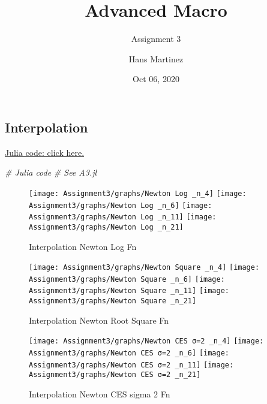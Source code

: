 \documentclass[]{article}
\title{Advanced Macro}
\subtitle{Assignment 3}
\author{Hans Martinez}
\date{Oct 06, 2020}
\newenvironment{Shaded}{\begin{snugshade}}{\end{snugshade}}
\newcommand{\CommentTok}[1]{\textcolor[rgb]{0.56,0.35,0.01}{\textit{#1}}}
\begin{document}
\maketitle

\hypertarget{interpolation}{%
\subsection{Interpolation}\label{interpolation}}

\href{https://github.com/hans-mtz/AdvMacro/blob/master/A3.jl}{Julia
code: click here.}

\begin{Shaded}
\begin{Highlighting}[]
\CommentTok{# Julia code}
\CommentTok{# See A3.jl}
\end{Highlighting}
\end{Shaded}

\begin{figure}

{\centering \texttt{[image: Assignment3/graphs/Newton Log \_n\_4]} \texttt{[image: Assignment3/graphs/Newton Log \_n\_6]} \texttt{[image: Assignment3/graphs/Newton Log \_n\_11]} \texttt{[image: Assignment3/graphs/Newton Log \_n\_21]} 

}

\caption{Interpolation Newton Log Fn}\label{fig:unnamed-chunk-2}
\end{figure}

\begin{figure}

{\centering \texttt{[image: Assignment3/graphs/Newton Square \_n\_4]} \texttt{[image: Assignment3/graphs/Newton Square \_n\_6]} \texttt{[image: Assignment3/graphs/Newton Square \_n\_11]} \texttt{[image: Assignment3/graphs/Newton Square \_n\_21]} 

}

\caption{Interpolation Newton Root Square Fn}\label{fig:unnamed-chunk-3}
\end{figure}

\begin{figure}

{\centering \texttt{[image: Assignment3/graphs/Newton CES σ=2 \_n\_4]} \texttt{[image: Assignment3/graphs/Newton CES σ=2 \_n\_6]} \texttt{[image: Assignment3/graphs/Newton CES σ=2 \_n\_11]} \texttt{[image: Assignment3/graphs/Newton CES σ=2 \_n\_21]} 

}

\caption{Interpolation Newton CES sigma 2 Fn}\label{fig:unnamed-chunk-4}
\end{figure}
\end{document}
